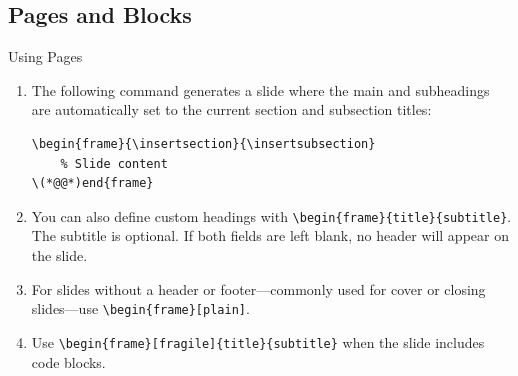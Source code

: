 \documentclass[8pt]{beamer}
\begin{document}
\subsection{Pages and Blocks}
\begin{frame}[fragile]{\insertsection}{\insertsubsection}
    \begin{block}{Using Pages}
        \begin{enumerate}
            \item The following command generates a slide where the main and subheadings are automatically set to the current section and subsection titles:
            \begin{lstlisting}[style=latex]
\begin{frame}{\insertsection}{\insertsubsection}
    % Slide content
\(*@@*)end{frame}
            \end{lstlisting}
            \item You can also define custom headings with \lstinline|\begin{frame}{title}{subtitle}|. The subtitle is optional. If both fields are left blank, no header will appear on the slide.
            \item For slides without a header or footer—commonly used for cover or closing slides—use \lstinline|\begin{frame}[plain]|.
            \item Use \lstinline|\begin{frame}[fragile]{title}{subtitle}| when the slide includes code blocks.
        \end{enumerate}
    \end{block}
\end{frame}
\end{document}
